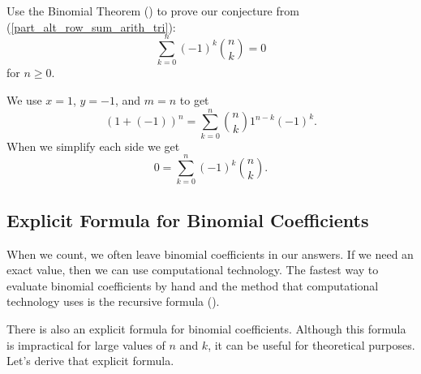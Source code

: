 \begin{exam}
\label{exam_bin_thm_proof}
    Use the Binomial Theorem () to prove our conjecture from  (\ref{part_alt_row_sum_arith_tri}): $$\sum_{k=0}^n(-1)^k\binom{n}{k}=0$$ for $n \ge 0$.  
           \begin{soln}
               We use $x=1$, $y=-1$, and $m=n$ to get
               $$(1+(-1))^n=\sum_{k=0}^n\binom{n}{k}1^{n-k}(-1)^k.$$
               When we simplify each side we get
               $$0=\sum_{k=0}^n(-1)^k\binom{n}{k}.$$
           \end{soln}
\end{exam}

\newcommand{\subfactorialbinom}{Explicit Formula for Binomial Coefficients}
\subsection{\subfactorialbinom}
\label{sub_factorial_binomial}

When we count, we often leave binomial coefficients in our answers. If we need an exact value, then we can use computational technology.  The fastest way to evaluate binomial coefficients by hand and the method that computational technology uses is the recursive formula (). 

There is also an explicit formula for binomial coefficients.  Although this formula is impractical for large values of $n$ and $k$, it can be useful for theoretical purposes.  Let's derive that explicit formula.

